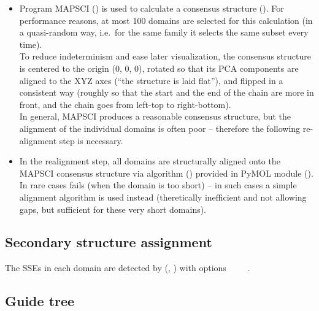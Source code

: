 \documentclass{article}
\begin{document}
\begin{itemize}
\item
  Program MAPSCI () is used to calculate a
  consensus structure ().
  For performance reasons, at most 100 domains are selected for this
  calculation (in a quasi-random way, i.e.~for the same family it selects 
  the same subset every time).\\
  To reduce indeterminism and ease later visualization, the consensus
  structure is centered to the origin (0, 0, 0), rotated so that its PCA
  components are aligned to the XYZ axes (``the structure is laid
  flat''), and flipped in a consistent way (roughly so that the start and 
  the end of the chain are more in front, and the chain goes from left-top 
  to right-bottom).\\
  In general, MAPSCI produces a reasonable consensus structure, but the
  alignment of the individual domains is often poor -- therefore the
  following re-alignment step is necessary.
\item
  In the realignment step, all domains are structurally aligned onto the
  MAPSCI consensus structure via  algorithm 
  ()
  provided in PyMOL module (). In rare cases
   fails (when the domain is too short) -- in such cases a
  simple alignment algorithm  is used instead
  (theretically inefficient and not allowing gaps, but sufficient for these
  very short domains).
\end{itemize}



\subsection{Secondary structure assignment}

The SSEs in each domain are detected by  
(, ) 
with options ~ ~ ~.



\subsection{Guide tree}
\end{document}
